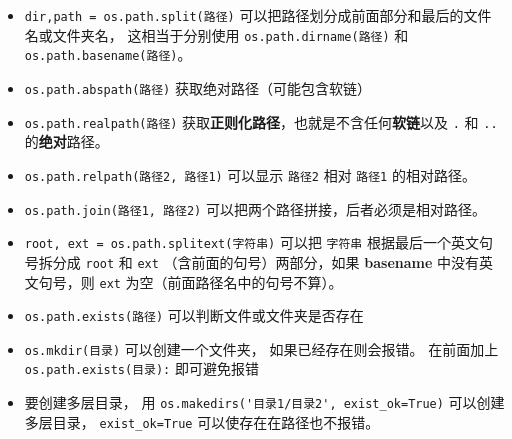\begin{itemize}
\item \verb`dir,path = os.path.split(路径)` 可以把路径划分成前面部分和最后的文件名或文件夹名， 这相当于分别使用 \verb`os.path.dirname(路径)` 和 \verb`os.path.basename(路径)`。
\item \verb`os.path.abspath(路径)` 获取绝对路径（可能包含软链）
\item \verb`os.path.realpath(路径)` 获取\textbf{正则化路径}，也就是不含任何\textbf{软链}以及 \verb`.` 和 \verb`..` 的\textbf{绝对}路径。
\item \verb`os.path.relpath(路径2, 路径1)` 可以显示 \verb`路径2` 相对 \verb`路径1` 的相对路径。
\item \verb`os.path.join(路径1, 路径2)` 可以把两个路径拼接，后者必须是相对路径。
\item \verb`root, ext = os.path.splitext(字符串)` 可以把 \verb`字符串` 根据最后一个英文句号拆分成 \verb`root` 和 \verb`ext` （含前面的句号）两部分，如果 \textbf{basename} 中没有英文句号，则 \verb`ext` 为空（前面路径名中的句号不算）。
\item \verb`os.path.exists(路径)` 可以判断文件或文件夹是否存在
\item \verb`os.mkdir(目录)` 可以创建一个文件夹， 如果已经存在则会报错。 在前面加上 \verb`os.path.exists(目录):` 即可避免报错
\item 要创建多层目录， 用 \verb`os.makedirs('目录1/目录2', exist_ok=True)` 可以创建多层目录， \verb`exist_ok=True` 可以使存在在路径也不报错。
\end{itemize}
